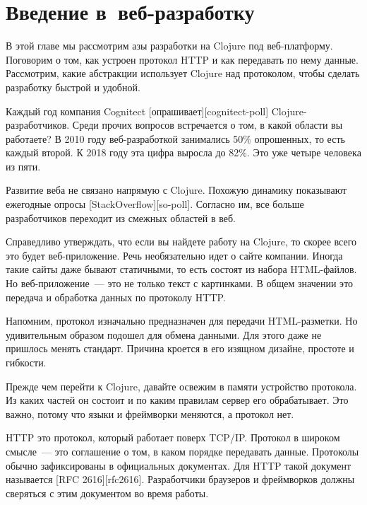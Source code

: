 \chapter{Введение в~веб-разработку}

В этой главе мы рассмотрим азы разработки на Clojure под
веб-платформу. Поговорим о том, как устроен протокол HTTP и как передавать по
нему данные. Рассмотрим, какие абстракции использует Clojure над протоколом,
чтобы сделать разработку быстрой и удобной.


Каждый год компания Cognitect [опрашивает][cognitect-poll]
Clojure-разработчиков. Среди прочих вопросов встречается о том, в какой области
вы работаете? В 2010 году веб-разработкой занимались 50\% опрошенных, то есть
каждый второй. К 2018 году эта цифра выросла до 82\%. Это уже четыре человека из
пяти.


Развитие веба не связано напрямую с Clojure. Похожую динамику показывают
ежегодные опросы [StackOverflow][so-poll]. Согласно им, все больше разработчиков
переходит из смежных областей в веб.

Справедливо утверждать, что если вы найдете работу на Clojure, то скорее всего
это будет веб-приложение. Речь необязательно идет о сайте компании. Иногда такие
сайты даже бывают статичными, то есть состоят из набора HTML-файлов. Но
веб-приложение~--- это не только текст с картинками. В общем значении это передача
и обработка данных по протоколу HTTP.

Напомним, протокол изначально предназначен для передачи HTML-разметки. Но
удивительным образом подошел для обмена данными. Для этого даже не пришлось
менять стандарт. Причина кроется в его изящном дизайне, простоте и гибкости.

Прежде чем перейти к Clojure, давайте освежим в памяти устройство протокола. Из
каких частей он состоит и по каким правилам сервер его обрабатывает. Это важно,
потому что языки и фреймворки меняются, а протокол нет.


HTTP это протокол, который работает поверх TCP/IP. Протокол в широком смысле~---
это соглашение о том, в каком порядке передавать данные. Протоколы обычно
зафиксированы в официальных документах. Для HTTP такой документ называется [RFC
2616][rfc2616]. Разработчики браузеров и фреймворков должны сверяться с этим
документом во время работы.

